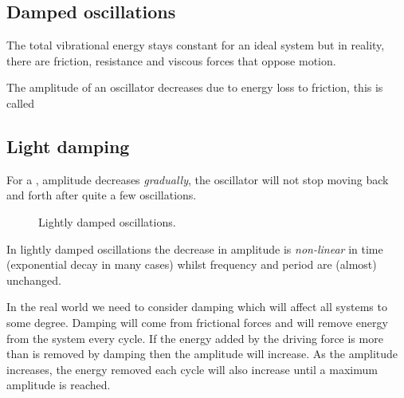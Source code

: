 \subsection{Damped oscillations}

The total vibrational energy stays constant for an ideal system but in reality, there are friction, resistance and viscous forces that oppose motion.

\begin{ilight}
	The amplitude of an oscillator decreases due to energy loss to friction, this is called 
\end{ilight} 

\subsection{Light damping}

For a , amplitude decreases \emph{gradually}, the oscillator will not stop moving back and forth after quite a few oscillations.

\begin{figure*}[ht]
\centering
{}
\caption{Lightly damped oscillations.}
\end{figure*}

In lightly damped oscillations the decrease in amplitude is \emph{non-linear} in time (exponential decay in many cases) whilst frequency and period are (almost) unchanged.

	In the real world we need to consider damping which will affect all systems to some degree. Damping will come from frictional forces and will remove energy from the system every cycle. If the energy added by the driving force is more than is removed by damping then the amplitude will increase. As the amplitude increases, the energy removed each cycle will also increase until a maximum amplitude is reached.
	
